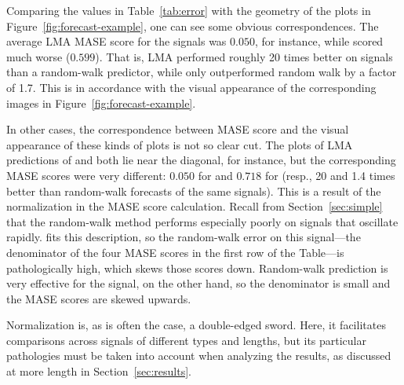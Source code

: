 Comparing the values in Table~\ref{tab:error} with the geometry of the
plots in Figure~\ref{fig:forecast-example}, one can see some obvious
correspondences.  The average LMA MASE score for the \col signals was
$0.050$, for instance, while \arima scored much worse ($0.599$).  That
is, LMA performed roughly 20 times better on \col signals than a
random-walk predictor, while \arima only outperformed random walk by a
factor of 1.7.  This is in accordance with the visual appearance of
the corresponding images in Figure~\ref{fig:forecast-example}.  

In other cases, the correspondence between MASE score and the visual
appearance of these kinds of plots is not so clear cut.  The plots of
LMA predictions of \col and \svdfive both lie near the diagonal, for
instance, but the corresponding MASE scores were very different:
$0.050$ for \col and $0.718$ for \svdfive (resp., 20 and 1.4 times
better than random-walk forecasts of the same signals).  This is a
result of the normalization in the MASE score calculation.  Recall
from Section~\ref{sec:simple} that the random-walk method performs
especially poorly on signals that oscillate rapidly.  \col fits this
description, so the random-walk error on this signal---the denominator
of the four MASE scores in the first row of the Table---is
pathologically high, which skews those scores down.  Random-walk
prediction is very effective for the \svdfive signal, on the other
hand, so the denominator is small and the MASE scores are skewed
upwards.  

Normalization is, as is often the case, a double-edged sword.  Here,
it facilitates comparisons across signals of different types and
lengths, but its particular pathologies must be taken into account
when analyzing the results, as discussed at more length in
Section~\ref{sec:results}.




